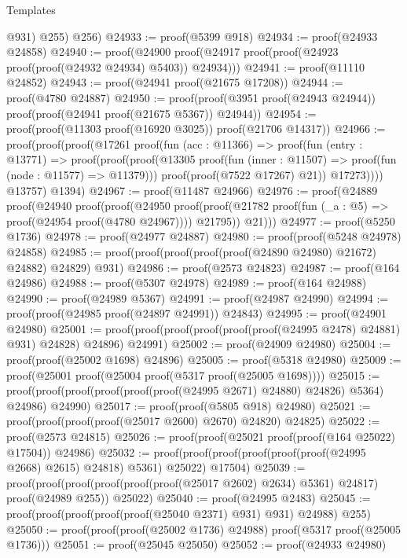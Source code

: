 \begin{lexlean}{Templates}
\begin{coremodule}
          @931)
        @255)
      @256)
@24933 := proof(@5399 @918)
@24934 := proof(@24933 @24858)
@24940 := proof(@24900 proof(@24917 proof(proof(@24923 proof(proof(@24932 @24934) @5403)) @24934)))
@24941 := proof(@11110 @24852)
@24943 := proof(@24941 proof(@21675 @17208))
@24944 := proof(@4780 @24887)
@24950 := proof(proof(@3951 proof(@24943 @24944)) proof(proof(@24941 proof(@21675 @5367)) @24944))
@24954 := proof(proof(@11303 proof(@16920 @3025)) proof(@21706 @14317))
@24966 := proof(proof(proof(@17261
          proof(fun (acc : @11366) =>
            proof(fun (entry : @13771) =>
              proof(proof(proof(@13305
                      proof(fun (inner : @11507) => proof(fun (node : @11577) => @11379)))
                    proof(proof(@7522 @17267) @21))
                  @17273))))
        @13757)
      @1394)
@24967 := proof(@11487 @24966)
@24976 := proof(@24889
      proof(@24940
          proof(proof(@24950
                proof(proof(@21782 proof(fun (_a : @5) => proof(@24954 proof(@4780 @24967))))
                    @21795))
              @21)))
@24977 := proof(@5250 @1736)
@24978 := proof(@24977 @24887)
@24980 := proof(proof(@5248 @24978) @24858)
@24985 := proof(proof(proof(proof(proof(@24890 @24980) @21672) @24882) @24829) @931)
@24986 := proof(@2573 @24823)
@24987 := proof(@164 @24986)
@24988 := proof(@5307 @24978)
@24989 := proof(@164 @24988)
@24990 := proof(@24989 @5367)
@24991 := proof(@24987 @24990)
@24994 := proof(proof(@24985 proof(@24897 @24991)) @24843)
@24995 := proof(@24901 @24980)
@25001 := proof(proof(proof(proof(proof(proof(@24995 @2478) @24881) @931) @24828) @24896) @24991)
@25002 := proof(@24909 @24980)
@25004 := proof(proof(@25002 @1698) @24896)
@25005 := proof(@5318 @24980)
@25009 := proof(@25001 proof(@25004 proof(@5317 proof(@25005 @1698))))
@25015 := proof(proof(proof(proof(proof(proof(@24995 @2671) @24880) @24826) @5364) @24986) @24990)
@25017 := proof(proof(@5805 @918) @24980)
@25021 := proof(proof(proof(proof(@25017 @2600) @2670) @24820) @24825)
@25022 := proof(@2573 @24815)
@25026 := proof(proof(@25021 proof(proof(@164 @25022) @17504)) @24986)
@25032 := proof(proof(proof(proof(proof(proof(@24995 @2668) @2615) @24818) @5361) @25022) @17504)
@25039 := proof(proof(proof(proof(proof(proof(@25017 @2602) @2634) @5361) @24817)
        proof(@24989 @255))
      @25022)
@25040 := proof(@24995 @2483)
@25045 := proof(proof(proof(proof(proof(@25040 @2371) @931) @931) @24988) @255)
@25050 := proof(proof(proof(@25002 @1736) @24988) proof(@5317 proof(@25005 @1736)))
@25051 := proof(@25045 @25050)
@25052 := proof(@24933 @24980)

\end{coremodule}
\end{lexlean}
